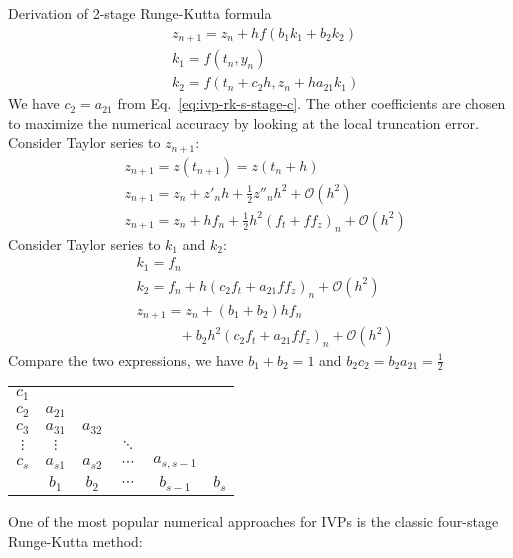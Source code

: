 \documentclass[letterpaper, 11pt]{article}
\providecommand{\On}[1]{\ensuremath{\mathcal{O}(h^{#1})}}
\begin{document}
\begin{margintable}
\footnotesize
Derivation of 2-stage Runge-Kutta formula\\
\begin{align*}
& z_{n+1} = z_{n} + h f\left( b_{1}k_{1} + b_{2}k_{2} \right)\\
& k_{1} = f \left( t_{n}, y_{n} \right)\\
& k_{2} = f \left( t_{n} + c_{2}h, z_{n} + ha_{21}k_{1} \right)
\end{align*}
We have $c_{2}=a_{21}$ from Eq.~\eqref{eq:ivp-rk-s-stage-c}. The other coefficients are chosen to maximize the numerical accuracy by looking at the local truncation error. Consider Taylor series to $z_{n+1}$:
\begin{align*}
& z_{n+1} = z(t_{n+1}) = z \left( t_{n} + h \right)\\
& z_{n+1} = z_{n} + z'_{n}h + \frac{1}{2}z''_{n}h^{2} + \On{2}\\
& z_{n+1} = z_{n} + hf_{n} + \frac{1}{2} h^{2}\left( f_{t} + ff_{z} \right)_{n} + \On{2}    
\end{align*}
Consider Taylor series to $k_{1}$ and $k_{2}$:
\begin{align*}
& k_{1} = f_{n} \\
& k_{2} = f_{n} + h \left( c_{2}f_{t} + a_{21}ff_{z} \right)_{n} + \On{2} \\
& z_{n+1} = z_{n} + (b_{1} + b_{2})hf_{n} \\
& \qquad \quad + b_{2}h^{2}\left( c_{2}f_{t} + a_{21}ff_{z} \right)_{n} + \On{2}
\end{align*}
Compare the two expressions, we have $b_{1} + b_{2} = 1$ and $b_{2}c_{2} = b_{2}a_{21} = \frac{1}{2}$ 
\end{margintable}
\begin{center}
\begin{tabular}{c|ccccc}
$c_{1}$ &          &           &          &             & \\
$c_{2}$ & $a_{21}$ &           &          &             & \\
$c_{3}$ & $a_{31}$ & $a_{32}$  &          &             & \\
$\vdots$& $\vdots$ &           & $\ddots$ &             & \\
$c_{s}$ & $a_{s1}$ & $a_{s2}$  & $\cdots$ & $a_{s,s-1}$ & \\ \hline
        & $b_{1}$  & $b_{2}$   & $\cdots$ & $b_{s-1}$   & $b_{s}$
\end{tabular}
\end{center}
One of the most popular numerical approaches for IVPs is the classic four-stage Runge-Kutta method:
\end{document}
